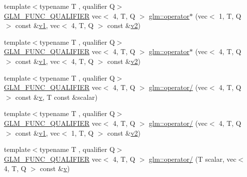 \begin{DoxyCompactItemize}
\item 
{\footnotesize template$<$typename T , qualifier Q$>$ }\\\mbox{\hyperlink{setup_8hpp_a33fdea6f91c5f834105f7415e2a64407}{G\+L\+M\+\_\+\+F\+U\+N\+C\+\_\+\+Q\+U\+A\+L\+I\+F\+I\+ER}} vec$<$ 4, T, Q $>$ \mbox{\hyperlink{namespaceglm_a93d4041d5c565d72d3f8a565ae16f04f}{glm\+::operator$\ast$}} (vec$<$ 1, T, Q $>$ const \&\mbox{\hyperlink{_s_d_l__opengl__glext_8h_a435c176a02c061b43e19bdf7c86cceae}{v1}}, vec$<$ 4, T, Q $>$ const \&\mbox{\hyperlink{_s_d_l__opengl__glext_8h_a0928f6d0f0f794ba000a21dfae422136}{v2}})
\item 
{\footnotesize template$<$typename T , qualifier Q$>$ }\\\mbox{\hyperlink{setup_8hpp_a33fdea6f91c5f834105f7415e2a64407}{G\+L\+M\+\_\+\+F\+U\+N\+C\+\_\+\+Q\+U\+A\+L\+I\+F\+I\+ER}} vec$<$ 4, T, Q $>$ \mbox{\hyperlink{namespaceglm_a5786094aba4cc79c73bc46174181dee8}{glm\+::operator$\ast$}} (vec$<$ 4, T, Q $>$ const \&\mbox{\hyperlink{_s_d_l__opengl__glext_8h_a435c176a02c061b43e19bdf7c86cceae}{v1}}, vec$<$ 4, T, Q $>$ const \&\mbox{\hyperlink{_s_d_l__opengl__glext_8h_a0928f6d0f0f794ba000a21dfae422136}{v2}})
\item 
{\footnotesize template$<$typename T , qualifier Q$>$ }\\\mbox{\hyperlink{setup_8hpp_a33fdea6f91c5f834105f7415e2a64407}{G\+L\+M\+\_\+\+F\+U\+N\+C\+\_\+\+Q\+U\+A\+L\+I\+F\+I\+ER}} vec$<$ 4, T, Q $>$ \mbox{\hyperlink{namespaceglm_a1355cec272d1f7084b3138474394b67c}{glm\+::operator/}} (vec$<$ 4, T, Q $>$ const \&\mbox{\hyperlink{_s_d_l__opengl_8h_a10a82eabcb59d2fcd74acee063775f90}{v}}, T const \&scalar)
\item 
{\footnotesize template$<$typename T , qualifier Q$>$ }\\\mbox{\hyperlink{setup_8hpp_a33fdea6f91c5f834105f7415e2a64407}{G\+L\+M\+\_\+\+F\+U\+N\+C\+\_\+\+Q\+U\+A\+L\+I\+F\+I\+ER}} vec$<$ 4, T, Q $>$ \mbox{\hyperlink{namespaceglm_ac72d84b26788cb76cb6a96fd61e96297}{glm\+::operator/}} (vec$<$ 4, T, Q $>$ const \&\mbox{\hyperlink{_s_d_l__opengl__glext_8h_a435c176a02c061b43e19bdf7c86cceae}{v1}}, vec$<$ 1, T, Q $>$ const \&\mbox{\hyperlink{_s_d_l__opengl__glext_8h_a0928f6d0f0f794ba000a21dfae422136}{v2}})
\item 
{\footnotesize template$<$typename T , qualifier Q$>$ }\\\mbox{\hyperlink{setup_8hpp_a33fdea6f91c5f834105f7415e2a64407}{G\+L\+M\+\_\+\+F\+U\+N\+C\+\_\+\+Q\+U\+A\+L\+I\+F\+I\+ER}} vec$<$ 4, T, Q $>$ \mbox{\hyperlink{namespaceglm_af8e797292f24d842f31bf46ad60af9f9}{glm\+::operator/}} (T scalar, vec$<$ 4, T, Q $>$ const \&\mbox{\hyperlink{_s_d_l__opengl_8h_a10a82eabcb59d2fcd74acee063775f90}{v}})

\end{DoxyCompactItemize}
